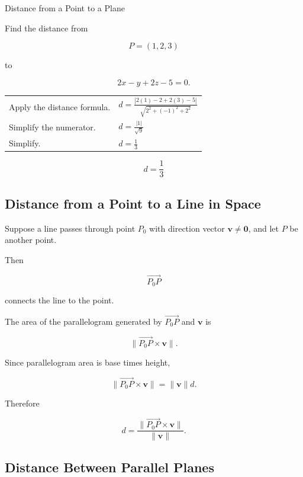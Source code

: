 \begin{workedexamplebox}{Distance from a Point to a Plane}

Find the distance from

\[ P=(1,2,3) \]

to

\[ 2x-y+2z-5=0. \]

\begin{tabularx}{\textwidth}{@{}>{\raggedright\arraybackslash}p{}X@{}}
Apply the distance formula. &
\(d=\frac{|2(1)-2+2(3)-5|}{\sqrt{2^2+(-1)^2+2^2}}\)\\
Simplify the numerator. &
\(d=\frac{|1|}{\sqrt9}\)\\
Simplify. &
\(d=\frac13\)
\end{tabularx}

\begin{answerbox}
\[ \boxed{d=\frac13} \]
\end{answerbox}
\end{workedexamplebox}

\subsection{Distance from a Point to a Line in Space}
\label{subsec:point-line-distance-space}

Suppose a line passes through point \(P_0\) with direction vector
\(\mathbf{v}\neq\mathbf{0}\), and let \(P\) be another point.

Then

\[
\overrightarrow{P_0P}
\]

connects the line to the point.

The area of the parallelogram generated by
\(\overrightarrow{P_0P}\) and \(\mathbf{v}\) is

\[
\|\overrightarrow{P_0P}\times\mathbf{v}\|.
\]

Since parallelogram area is base times height,

\[
\|\overrightarrow{P_0P}\times\mathbf{v}\|
=
\|\mathbf{v}\|d.
\]

Therefore

\[
\boxed{
d
=
\frac{
\|\overrightarrow{P_0P}\times\mathbf{v}\|
}{
\|\mathbf{v}\|
}.
}
\]

\subsection{Distance Between Parallel Planes}
\label{subsec:distance-parallel-planes}

